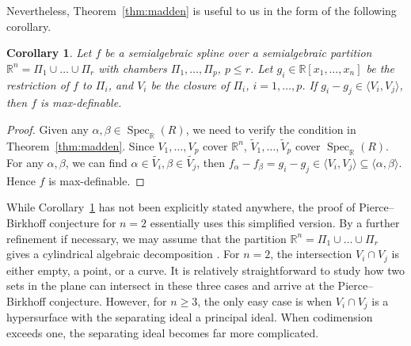 \documentclass[11pt]{amsart}
\theoremstyle{plain}
\newtheorem{corollary}[theorem]{Corollary}
\theoremstyle{definition}
\DeclareMathOperator{\Spec}{Spec}
\begin{document}
Nevertheless, Theorem~\ref{thm:madden} is useful to us in the form of the following corollary.
\begin{corollary}\label{cor:separating}
Let $f$ be a semialgebraic spline over  a semialgebraic partition $\mathbb{R}^n = \Pi_1 \cup \dots \cup \Pi_r$ with chambers $\Pi_1,\dots,\Pi_p$,  $p \le r$. Let $g_i \in \mathbb{R}[x_1, \dots, x_n]$ be the restriction of $f$ to $\Pi_i$, and $V_i $ be the closure of $\Pi_i$, $i =1,\dots,p$. If $g_i - g_j \in \langle V_i, V_j \rangle$, then $f$ is max-definable. 
\end{corollary}
\begin{proof}
Given any $\alpha, \beta \in \Spec_{\mathbb{R}}(R)$, we need to verify the condition in Theorem~\ref{thm:madden}. Since $V_1, \dots, V_p$ cover $\mathbb{R}^n$, $\widetilde{V}_1, \dots, \widetilde{V}_p$ cover $\Spec_{\mathbb{R}}(R)$. For any $\alpha, \beta$, we can find $\alpha \in \widetilde{V_i}, \beta \in \widetilde{V_j}$, then $f_\alpha - f_\beta = g_i - g_j \in \langle V_i, V_j\rangle \subseteq \langle \alpha, \beta \rangle$. Hence $f$ is max-definable. 
\end{proof}
While Corollary~\ref{cor:separating} has not been explicitly stated anywhere, the proof of Pierce--Birkhoff conjecture for $n =2$ \cite{Mahe1984} essentially uses this simplified version. By a further refinement if necessary, we may assume that the partition $\mathbb{R}^n = \Pi_1 \cup \dots \cup \Pi_r$ gives a cylindrical algebraic decomposition \cite{bochnak2013real}. For $n = 2$, the intersection $V_i \cap V_j$ is either empty, a point, or a curve. It is relatively straightforward to study how two sets in the plane can intersect in these three cases and arrive at the Pierce--Birkhoff conjecture. However, for $n \ge 3$, the only easy case is when $V_i \cap V_j$ is a hypersurface with the separating ideal a principal ideal. When codimension exceeds one, the separating ideal becomes far more complicated. 
\end{document}
